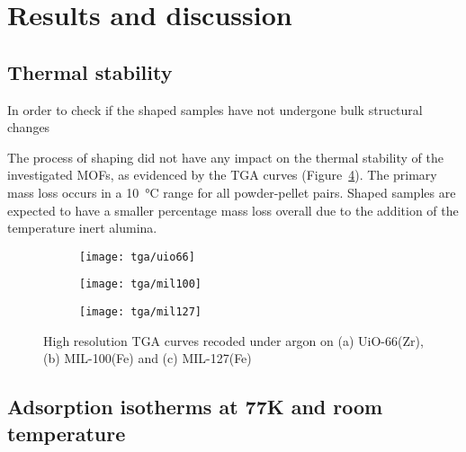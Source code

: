 
\section{Results and discussion}

\subsection{Thermal stability}

In order to check if the shaped samples have not undergone bulk
structural changes

The process of shaping did not have any impact on the thermal stability of 
the investigated MOFs, as evidenced by the TGA curves 
(Figure~\ref{fig:ch4:tgacurves}). The primary mass loss occurs 
in a \SI{10}{\degreeCelsius} range for all powder-pellet pairs.
Shaped samples are expected to have a smaller percentage mass loss 
overall due to the addition of the temperature inert alumina. 

\begin{figure}
    \centering
    \begin{subfigure}{0.8\textwidth}
        \parbox[c]{0.1\linewidth}{\caption{}\label{fig:ch4:tgauio66}}%
        \parbox[b]{0.7\linewidth}{%
        \texttt{[image: tga/uio66]}%
        }%
    \end{subfigure}

    \begin{subfigure}{0.8\textwidth}
        \parbox[c]{0.1\linewidth}{\caption{}\label{fig:ch4:tgamil100}}%
        \parbox[b]{0.7\linewidth}{%
        \texttt{[image: tga/mil100]}%
        }%
    \end{subfigure}

    \begin{subfigure}{0.8\textwidth}
        \parbox[c]{0.1\linewidth}{\caption{}\label{fig:ch4:tgamil127}}%
        \parbox[b]{0.7\linewidth}{%
        \texttt{[image: tga/mil127]}%
        }%
    \end{subfigure}
    
    \caption{High resolution TGA curves recoded under argon 
    on (a) UiO-66(Zr), (b) MIL-100(Fe) and (c) MIL-127(Fe)}%
    \label{fig:ch4:tgacurves}

\end{figure}

\subsection{Adsorption isotherms at 77K and room temperature}

